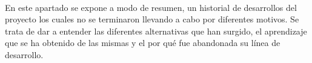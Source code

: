 \paragraph{}
En este apartado se expone a modo de resumen, un historial de desarrollos del proyecto los cuales no se terminaron llevando a cabo por diferentes motivos. 
Se trata de dar a entender las diferentes alternativas que han surgido, el aprendizaje que se ha obtenido de las mismas y el por qué fue abandonada su línea de desarrollo.
